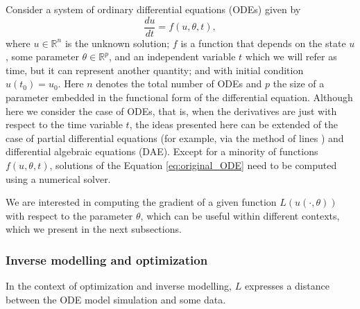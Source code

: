 Consider a system of ordinary differential equations (ODEs) given by
\begin{equation}
 \frac{du}{dt} = f(u, \theta, t),
 \label{eq:original_ODE}
\end{equation}
where $u \in \mathbb{R}^n$ is the unknown solution; $f$ is a function that depends on the state $u$, some parameter $\theta \in \mathbb R^p$, and an independent variable $t$ which we will refer as time, but it can represent another quantity; and with initial condition $u(t_0) = u_0$.
Here $n$ denotes the total number of ODEs and $p$ the size of a parameter embedded in the functional form of the differential equation.
Although here we consider the case of ODEs, that is, when the derivatives are just with respect to the time variable $t$, the ideas presented here can be extended of the case of partial differential equations (for example, via the method of lines \cite{ascher2008numerical}) and differential algebraic equations (DAE).
Except for a minority of functions $f(u,\theta, t)$, solutions of the Equation \eqref{eq:original_ODE} need to be computed using a numerical solver. 

We are interested in computing the gradient of a given function $L(u(\cdot, \theta))$ with respect to the parameter $\theta$, which can be useful within different contexts, which we present in the next subsections.

\subsubsection{Inverse modelling and optimization}

In the context of optimization and inverse modelling, $L$ expresses a distance between the ODE model simulation and some data. 

